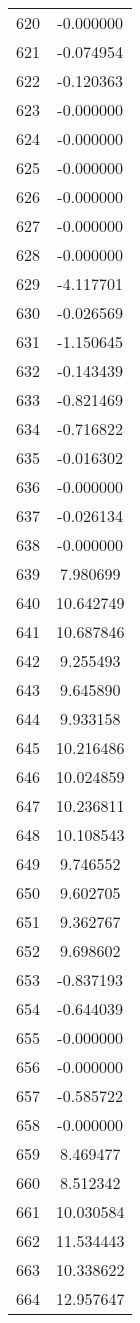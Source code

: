 \documentclass[12pt]{article}
\begin{document}
\begin{longtable}{@{}cc@{}}
620 & -0.000000 \\
621 & -0.074954 \\
622 & -0.120363 \\
623 & -0.000000 \\
624 & -0.000000 \\
625 & -0.000000 \\
626 & -0.000000 \\
627 & -0.000000 \\
628 & -0.000000 \\
629 & -4.117701 \\
630 & -0.026569 \\
631 & -1.150645 \\
632 & -0.143439 \\
633 & -0.821469 \\
634 & -0.716822 \\
635 & -0.016302 \\
636 & -0.000000 \\
637 & -0.026134 \\
638 & -0.000000 \\
639 & 7.980699 \\
640 & 10.642749 \\
641 & 10.687846 \\
642 & 9.255493 \\
643 & 9.645890 \\
644 & 9.933158 \\
645 & 10.216486 \\
646 & 10.024859 \\
647 & 10.236811 \\
648 & 10.108543 \\
649 & 9.746552 \\
650 & 9.602705 \\
651 & 9.362767 \\
652 & 9.698602 \\
653 & -0.837193 \\
654 & -0.644039 \\
655 & -0.000000 \\
656 & -0.000000 \\
657 & -0.585722 \\
658 & -0.000000 \\
659 & 8.469477 \\
660 & 8.512342 \\
661 & 10.030584 \\
662 & 11.534443 \\
663 & 10.338622 \\
664 & 12.957647 \\

\end{longtable}
\end{document}
